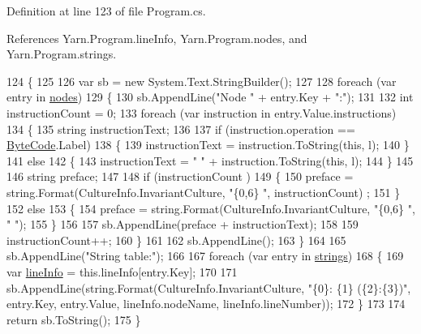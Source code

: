 Definition at line 123 of file Program.\-cs.



References Yarn.\-Program.\-line\-Info, Yarn.\-Program.\-nodes, and Yarn.\-Program.\-strings.


\begin{DoxyCode}
124         \{
125 
126             var sb = \textcolor{keyword}{new} System.Text.StringBuilder();
127 
128             \textcolor{keywordflow}{foreach} (var entry \textcolor{keywordflow}{in} \hyperlink{a00138_a3f4928a577c88263ad016be259b175c4}{nodes})
129             \{
130                 sb.AppendLine(\textcolor{stringliteral}{"Node "} + entry.Key + \textcolor{stringliteral}{":"});
131 
132                 \textcolor{keywordtype}{int} instructionCount = 0;
133                 \textcolor{keywordflow}{foreach} (var instruction \textcolor{keywordflow}{in} entry.Value.instructions)
134                 \{
135                     \textcolor{keywordtype}{string} instructionText;
136 
137                     \textcolor{keywordflow}{if} (instruction.operation == \hyperlink{a00048_ad5dfb6ee68ca7469623ad3e459f98894}{ByteCode}.Label)
138                     \{
139                         instructionText = instruction.ToString(\textcolor{keyword}{this}, l);
140                     \}
141                     \textcolor{keywordflow}{else}
142                     \{
143                         instructionText = \textcolor{stringliteral}{"    "} + instruction.ToString(\textcolor{keyword}{this}, l);
144                     \}
145 
146                     \textcolor{keywordtype}{string} preface;
147 
148                     \textcolor{keywordflow}{if} (instructionCount %
      )
149                     \{
150                         preface = string.Format(CultureInfo.InvariantCulture, \textcolor{stringliteral}{"\{0,6\}   "}, instructionCount)
      ;
151                     \}
152                     \textcolor{keywordflow}{else}
153                     \{
154                         preface = string.Format(CultureInfo.InvariantCulture, \textcolor{stringliteral}{"\{0,6\}   "}, \textcolor{stringliteral}{" "});
155                     \}
156 
157                     sb.AppendLine(preface + instructionText);
158 
159                     instructionCount++;
160                 \}
161 
162                 sb.AppendLine();
163             \}
164 
165             sb.AppendLine(\textcolor{stringliteral}{"String table:"});
166 
167             \textcolor{keywordflow}{foreach} (var entry \textcolor{keywordflow}{in} \hyperlink{a00138_a59263e00cecfe36d9881b4c30b048f09}{strings})
168             \{
169                 var \hyperlink{a00138_a0d4da395947767b4a1eaaff8a9842adc}{lineInfo} = this.lineInfo[entry.Key];
170 
171                 sb.AppendLine(string.Format(CultureInfo.InvariantCulture, \textcolor{stringliteral}{"\{0\}: \{1\} (\{2\}:\{3\})"}, entry.Key, 
      entry.Value, lineInfo.nodeName, lineInfo.lineNumber));
172             \}
173 
174             \textcolor{keywordflow}{return} sb.ToString();
175         \}
\end{DoxyCode}
